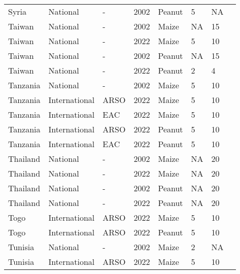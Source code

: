 \begin{landscape}
\begin{longtable}[c]{llllllll}
Syria             & National      & -        & 2002 & Peanut & 5  & NA & \citet{van2004worldwide}     \\
Taiwan            & National      & -        & 2002 & Maize  & NA & 15 & \citet{van2004worldwide}     \\
Taiwan            & National      & -        & 2022 & Maize  & 5  & 10 & \citet{TFDA2019}             \\
Taiwan            & National      & -        & 2002 & Peanut & NA & 15 & \citet{van2004worldwide}     \\
Taiwan            & National      & -        & 2022 & Peanut & 2  & 4  & \citet{TFDA2019}             \\
Tanzania          & National      & -        & 2002 & Maize  & 5  & 10 & \citet{van2004worldwide}     \\
Tanzania          & International & ARSO     & 2022 & Maize  & 5  & 10 & \citet{ARSO2022}             \\
Tanzania          & International & EAC      & 2022 & Maize  & 5  & 10 & \citet{EAC2018}              \\
Tanzania          & International & ARSO     & 2022 & Peanut & 5  & 10 & \citet{ARSO2022}             \\
Tanzania          & International & EAC      & 2022 & Peanut & 5  & 10 & \citet{EAC2018}              \\
Thailand          & National      & -        & 2002 & Maize  & NA & 20 & \citet{van2004worldwide}     \\
Thailand          & National      & -        & 2022 & Maize  & NA & 20 & \citet{TACFS2009}            \\
Thailand          & National      & -        & 2002 & Peanut & NA & 20 & \citet{van2004worldwide}     \\
Thailand          & National      & -        & 2022 & Peanut & NA & 20 & \citet{TACFS2014}            \\
Togo              & International & ARSO     & 2022 & Maize  & 5  & 10 & \citet{ARSO2022}             \\
Togo              & International & ARSO     & 2022 & Peanut & 5  & 10 & \citet{ARSO2022}             \\
Tunisia           & National      & -        & 2002 & Maize  & 2  & NA & \citet{van2004worldwide}     \\
Tunisia           & International & ARSO     & 2022 & Maize  & 5  & 10 & \citet{ARSO2022}             \\

\end{longtable}
\end{landscape}
